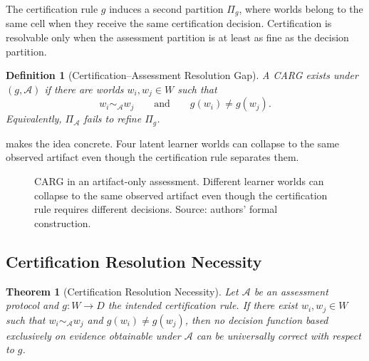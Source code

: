 \documentclass[11pt]{article}
\newtheorem{theorem}{Theorem}
\newtheorem{definition}{Definition}
\newcommand{\cA}{\mathcal{A}}
\begin{document}
The certification rule $g$ induces a second partition $\Pi_g$, where worlds belong to the same cell when they receive the same certification decision. Certification is resolvable only when the assessment partition is at least as fine as the decision partition.

\begin{definition}[Certification--Assessment Resolution Gap]
A CARG exists under $(g,\cA)$ if there are worlds $w_i,w_j\in W$ such that
\[
 w_i\sim_{\cA}w_j
 \qquad\text{and}\qquad
 g(w_i)\neq g(w_j).
\]
Equivalently, $\Pi_{\cA}$ fails to refine $\Pi_g$.
\end{definition}

 makes the idea concrete. Four latent learner worlds can collapse to the same observed artifact even though the certification rule separates them.

\begin{figure}[t]
\centering
{}
\caption{CARG in an artifact-only assessment. Different learner worlds can collapse to the same observed artifact even though the certification rule requires different decisions. Source: authors' formal construction.}
\label{fig:carg}
\end{figure}

\subsection{Certification Resolution Necessity}
\begin{theorem}[Certification Resolution Necessity]
Let $\cA$ be an assessment protocol and $g:W\to D$ the intended certification rule. If there exist $w_i,w_j\in W$ such that $w_i\sim_{\cA}w_j$ and $g(w_i)\neq g(w_j)$, then no decision function based exclusively on evidence obtainable under $\cA$ can be universally correct with respect to $g$.
\end{theorem}
\end{document}

